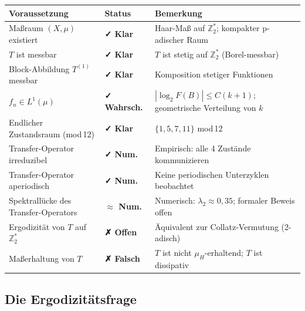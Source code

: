 \documentclass[12pt,a4paper]{article}
\newcommand{\Ztwo}{\mathbb{Z}_2}
\begin{document}
\begin{center}
\renewcommand{\arraystretch}{1.5}
\begin{tabular}{>{\raggedright}p{5.0cm}
                >{\centering}p{2.2cm}
                >{\raggedright\arraybackslash}p{5.0cm}}
\toprule
\textbf{Voraussetzung} & \textbf{Status} & \textbf{Bemerkung} \\
\midrule
Maßraum $(X, \mu)$ existiert
  & \textcolor{bewiesengrün}{\bfseries ✓ Klar}
  & Haar-Maß auf $\Ztwo^*$; kompakter p-adischer Raum \\[2pt]
$T$ ist messbar
  & \textcolor{bewiesengrün}{\bfseries ✓ Klar}
  & $T$ ist stetig auf $\Ztwo^*$ (Borel-messbar) \\[2pt]
Block-Abbildung $T^{(1)}$ messbar
  & \textcolor{bewiesengrün}{\bfseries ✓ Klar}
  & Komposition stetiger Funktionen \\[2pt]
$f_n \in L^1(\mu)$
  & \textcolor{bewiesengrün}{\bfseries ✓ Wahrsch.}
  & $|\log_2 F(B)| \leq C(k+1)$; geometrische Verteilung von $k$ \\[2pt]
Endlicher Zustandsraum (mod\,12)
  & \textcolor{bewiesengrün}{\bfseries ✓ Klar}
  & $\{1,5,7,11\}$ mod\,12 \\[2pt]
Transfer-Operator irreduzibel
  & \textcolor{bewiesengrün}{\bfseries ✓ Num.}
  & Empirisch: alle 4 Zustände kommunizieren \\[2pt]
Transfer-Operator aperiodisch
  & \textcolor{bewiesengrün}{\bfseries ✓ Num.}
  & Keine periodischen Unterzyklen beobachtet \\[2pt]
Spektrallücke des Transfer-Operators
  & \textcolor{warnorange}{\bfseries $\approx$ Num.}
  & Numerisch: $\lambda_2 \approx 0{,}35$; formaler Beweis offen \\[2pt]
Ergodizität von $T$ auf $\Ztwo^*$
  & \textcolor{lückenrot}{\bfseries ✗ Offen}
  & Äquivalent zur Collatz-Vermutung (2-adisch) \\[2pt]
Maßerhaltung von $T$
  & \textcolor{lückenrot}{\bfseries ✗ Falsch}
  & $T$ ist nicht $\mu_H$-erhaltend; $T$ ist dissipativ \\
\bottomrule
\end{tabular}
\end{center}

\subsection{Die Ergodizitätsfrage}
\end{document}
